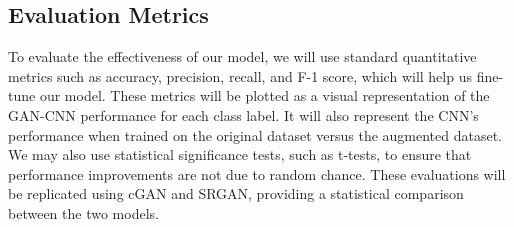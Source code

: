 \subsection{Evaluation Metrics}

To evaluate the effectiveness of our model, we will use standard quantitative metrics such as accuracy, precision, recall, and F-1 score, which will help us fine-tune our model. 
These metrics will be plotted as a visual representation of the GAN-CNN performance for each class label. 
It will also represent the CNN's performance when trained on the original dataset versus the augmented dataset. 
We may also use statistical significance tests, such as t-tests, to ensure that performance improvements are not due to random chance. 
These evaluations will be replicated using cGAN and SRGAN, providing a statistical comparison between the two models.